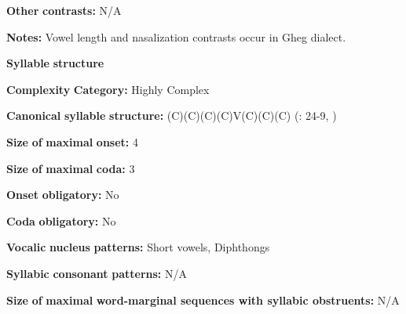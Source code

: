 \begin{styleBody}
\textbf{Other} \textbf{contrasts:} N/A
\end{styleBody}

\begin{styleBody}
\textbf{Notes:} Vowel length and nasalization contrasts occur in Gheg dialect.
\end{styleBody}

\begin{styleBody}
\textbf{Syllable} \textbf{structure}
\end{styleBody}

\begin{styleBody}
\textbf{Complexity} \textbf{Category:} Highly Complex
\end{styleBody}

\begin{styleBody}
\textbf{Canonical} \textbf{syllable} \textbf{structure:} (C)(C)(C)(C)V(C)(C)(C) (\citealt{Newmark1957}: 24-9, \citealt{Klippenstein2010})
\end{styleBody}

\begin{styleBody}
\textbf{Size} \textbf{of} \textbf{maximal} \textbf{onset:} 4
\end{styleBody}

\begin{styleBody}
\textbf{Size} \textbf{of} \textbf{maximal} \textbf{coda:} 3
\end{styleBody}

\begin{styleBody}
\textbf{Onset} \textbf{obligatory:} No
\end{styleBody}

\begin{styleBody}
\textbf{Coda} \textbf{obligatory:} No
\end{styleBody}

\begin{styleBody}
\textbf{Vocalic} \textbf{nucleus} \textbf{patterns:} Short vowels, Diphthongs
\end{styleBody}

\begin{styleBody}
\textbf{Syllabic} \textbf{consonant} \textbf{patterns:} N/A
\end{styleBody}

\begin{styleBody}
\textbf{Size} \textbf{of} \textbf{maximal} \textbf{word{}-marginal sequences with syllabic obstruents:} N/A
\end{styleBody}

